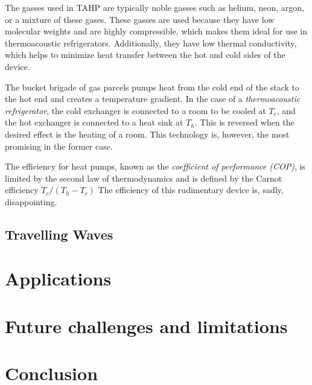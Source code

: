 \documentclass{article}
\begin{document}
The gasses used in TAHP are typically noble gasses such as helium, neon, argon, or a mixture of these gases. These gasses are used because they have low molecular weights and are highly compressible, which makes them ideal for use in thermoacoustic refrigerators. Additionally, they have low thermal conductivity, which helps to minimize heat transfer between the hot and cold sides of the device.

The bucket brigade of gas parcels pumps heat from the cold end of the stack to the hot end and creates a temperature gradient. In the case of a \emph{thermoacoustic refrigerator}, the cold exchanger is connected to a room to be cooled at \(T_c\), and the hot exchanger is connected to a heat sink at \(T_h\). This is reversed when the desired effect is the heating of a room. This technology is, however, the most promising in the former case.

The efficiency for heat pumps, known as the \emph{coefficient of performance (COP)}, is limited by the second law of thermodynamics and is defined by the Carnot efficiency \(T_c/(T_h-T_c)\)
The efficiency of this rudimentary device is, sadly, disappointing.







\subsection{Travelling Waves}

\section{Applications}

\section{Future challenges and limitations}

\section{Conclusion}


\end{document}

